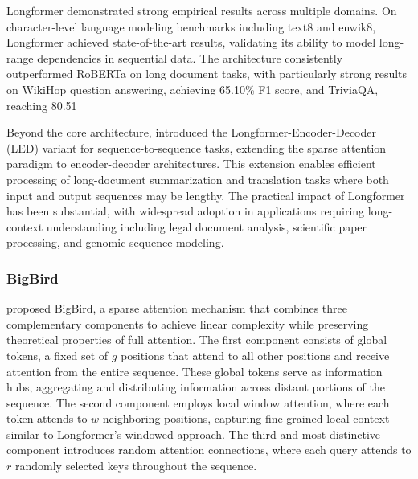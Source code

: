 Longformer demonstrated strong empirical results across multiple domains. On character-level language modeling benchmarks including text8 and enwik8, Longformer achieved state-of-the-art results, validating its ability to model long-range dependencies in sequential data. The architecture consistently outperformed RoBERTa on long document tasks, with particularly strong results on WikiHop question answering, achieving 65.10\% F1 score, and TriviaQA, reaching 80.51%

Beyond the core architecture, \citet{beltagy2020longformer} introduced the Longformer-Encoder-Decoder (LED) variant for sequence-to-sequence tasks, extending the sparse attention paradigm to encoder-decoder architectures. This extension enables efficient processing of long-document summarization and translation tasks where both input and output sequences may be lengthy. The practical impact of Longformer has been substantial, with widespread adoption in applications requiring long-context understanding including legal document analysis, scientific paper processing, and genomic sequence modeling.

\subsubsection{BigBird}

\citet{zaheer2020bigbird} proposed BigBird, a sparse attention mechanism that combines three complementary components to achieve linear complexity while preserving theoretical properties of full attention. The first component consists of global tokens, a fixed set of $g$ positions that attend to all other positions and receive attention from the entire sequence. These global tokens serve as information hubs, aggregating and distributing information across distant portions of the sequence. The second component employs local window attention, where each token attends to $w$ neighboring positions, capturing fine-grained local context similar to Longformer's windowed approach. The third and most distinctive component introduces random attention connections, where each query attends to $r$ randomly selected keys throughout the sequence.

